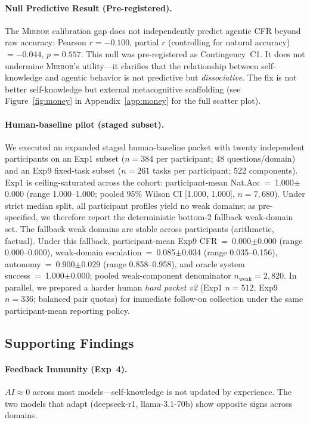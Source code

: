 \documentclass[10pt]{article}
\newcommand{\mirror}{\textsc{Mirror}}
\newcommand{\CFR}{CFR}
\newcommand{\AI}{AI}
\begin{document}
\paragraph{Null Predictive Result (Pre-registered).}
The \mirror{} calibration gap does not independently predict agentic \CFR{} beyond
raw accuracy: Pearson $r = -0.100$, partial $r$ (controlling for natural accuracy)
$= -0.044$, $p = 0.557$. This null was pre-registered as Contingency~C1. It does
not undermine \mirror{}'s utility---it clarifies that the relationship between
self-knowledge and agentic behavior is not predictive but \textit{dissociative}.
The fix is not better self-knowledge but external metacognitive scaffolding
(see Figure~\ref{fig:money} in Appendix~\ref{app:money} for the full scatter plot).

\paragraph{Human-baseline pilot (staged subset).}
We executed an expanded staged human-baseline packet with twenty independent
participants on an Exp1 subset ($n=384$ per participant; 48
questions/domain) and an Exp9 fixed-task subset ($n=261$ tasks per participant;
522 components). Exp1 is ceiling-saturated across the cohort:
participant-mean Nat.Acc~=~1.000$\pm$0.000 (range 1.000--1.000; pooled 95\%
Wilson CI [1.000, 1.000], $n=7{,}680$). Under strict median split, all
participant profiles yield no weak domains; as pre-specified, we therefore
report the deterministic bottom-2 fallback weak-domain set. The fallback weak
domains are stable across participants (arithmetic, factual). Under this
fallback, participant-mean Exp9 CFR~=~0.000$\pm$0.000 (range 0.000--0.000),
weak-domain escalation~=~0.085$\pm$0.034 (range 0.035--0.156),
autonomy~=~0.900$\pm$0.029 (range 0.858--0.958), and oracle system
success~=~1.000$\pm$0.000; pooled weak-component denominator
$n_{\text{weak}}=2{,}820$.
In parallel, we prepared a harder human \textit{hard packet v2} (Exp1
$n=512$, Exp9 $n=336$; balanced pair quotas) for immediate follow-on collection
under the same participant-mean reporting policy.

\subsection{Supporting Findings}

\paragraph{Feedback Immunity (Exp~4).}
$\AI{} \approx 0$ across most models---self-knowledge is not updated by experience. The two models that adapt (deepseek-r1, llama-3.1-70b) show opposite signs across domains.
\end{document}
